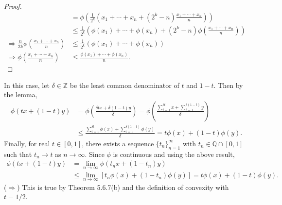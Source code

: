 \documentclass[a4paper,12pt]{article}
\begin{document}
\begin{enumerate}
\begin{proof}
\begin{align*}
                &= \phi\left( \frac{1}{2^k} \left( x_1 + \cdots + x_n + (2^k - n)\frac{x_1 + \cdots + x_n}{n} \right) \right) \\
                &\leq \frac{1}{2^k}\left( \phi(x_1) + \cdots + \phi(x_n) + (2^k - n)\phi\left( \frac{x_1 + \cdots + x_n}{n} \right) \right) \\
                \Rightarrow \frac{n}{2k} \phi\left( \frac{x_1 + \cdots + x_n}{n} \right)
                &\leq \frac{1}{2^k}\left( \phi(x_1) + \cdots + \phi(x_n) \right) \\
                \Rightarrow \phi\left( \frac{x_1 + \cdots + x_n}{n} \right)
                &\leq \frac{\phi(x_1) + \cdots + \phi(x_n)}{n}.
            \end{align*}
        \end{proof}
        In this case, let $\delta \in \mathbb{Z}$ be the least common denominator of $t$ and $1 - t$. Then by the lemma,
        \begin{align*}
            \phi(tx + (1 - t)y) &= \phi\left( \frac{\delta tx + \delta(1 - t)y}{\delta} \right)
            = \phi\left( \frac{\sum_{i = 1}^{\delta t} x + \sum_{i = 1}^{\delta(1 - t)}y}{\delta} \right) \\
            &\leq \frac{\sum_{i = 1}^{\delta t} \phi(x) + \sum_{i = 1}^{\delta(1 - t)} \phi(y)}{\delta}
            = t\phi(x) + (1 - t)\phi(y).
        \end{align*}
        Finally, for real $t \in [0, 1]$, there exists a sequence $\{ t_n \}_{n = 1}^\infty$ with $t_n \in \mathbb{Q} \cap [0, 1]$ such that $t_n \to t$ as $n \to \infty$. Since $\phi$ is continuous and using the above result,
        \begin{align*}
            \phi(tx + (1 - t)y) &= \lim_{n \to \infty} \phi(t_n x + (1 - t_n)y) \\
            &\leq \lim_{n \to \infty} [t_n\phi(x) + (1 - t_n)\phi(y)]
            = t\phi(x) + (1 - t)\phi(y).
        \end{align*}
        ($\Rightarrow$) This is true by Theorem 5.6.7(b) and the definition of convexity with $t = 1/2$. %


\end{enumerate}
\end{document}
